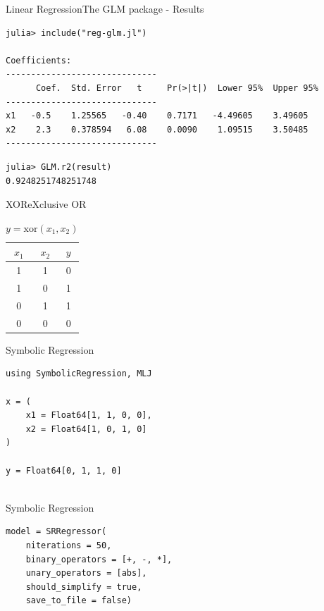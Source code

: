 \documentclass[11pt]{beamer}
\begin{document}
\begin{frame}[fragile]{Linear Regression}{The GLM package - Results}
\begin{lstlisting}[basicstyle=\tiny]
julia> include("reg-glm.jl")
	
Coefficients:
------------------------------
	  Coef.  Std. Error   t     Pr(>|t|)  Lower 95%  Upper 95%
------------------------------
x1   -0.5    1.25565   -0.40    0.7171   -4.49605    3.49605
x2    2.3    0.378594   6.08    0.0090    1.09515    3.50485
------------------------------
\end{lstlisting}

\begin{lstlisting}
julia> GLM.r2(result)
0.9248251748251748
\end{lstlisting}


\end{frame}


\begin{frame}[fragile]{XOR}{eXclusive OR}
\begin{table}
\centering
\begin{tabular}{|c|c|c|}
	\hline
	$x_1$ & $x_2$ & $y$ \\
	\hline 
	1 & 1 & 0 \\
	\hline 
	1 & 0 & 1 \\
	\hline 
	0 & 1 & 1 \\
	\hline 
	0 & 0 & 0 \\
	\hline 
\end{tabular}
\caption{$y = \text{xor}(x_1, x_2)$}
\end{table}
\end{frame}

\begin{frame}[fragile]{Symbolic Regression}
\begin{lstlisting}
using SymbolicRegression, MLJ

x = (
	x1 = Float64[1, 1, 0, 0], 
	x2 = Float64[1, 0, 1, 0]
)
		
y = Float64[0, 1, 1, 0]
		
\end{lstlisting}
\end{frame}


\begin{frame}[fragile]{Symbolic Regression}
	\begin{lstlisting}
model = SRRegressor(
	niterations = 50,
	binary_operators = [+, -, *],
	unary_operators = [abs],
	should_simplify = true,
	save_to_file = false)

\end{lstlisting}
\end{frame}
\end{document}
